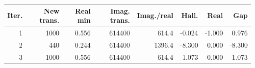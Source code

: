 \begin{tabular}{rrrrrrrr}
\toprule
Iter. & New trans. & Real min & Imag. trans. & Imag./real & Hall. & Real & Gap \\
\midrule
1 & 1000 & 0.556 & 614400 & 614.4 & -0.024 & -1.000 & 0.976 \\
2 & 440 & 0.244 & 614400 & 1396.4 & -8.300 & 0.000 & -8.300 \\
3 & 1000 & 0.556 & 614400 & 614.4 & 1.073 & 0.000 & 1.073 \\
\bottomrule
\end{tabular}
